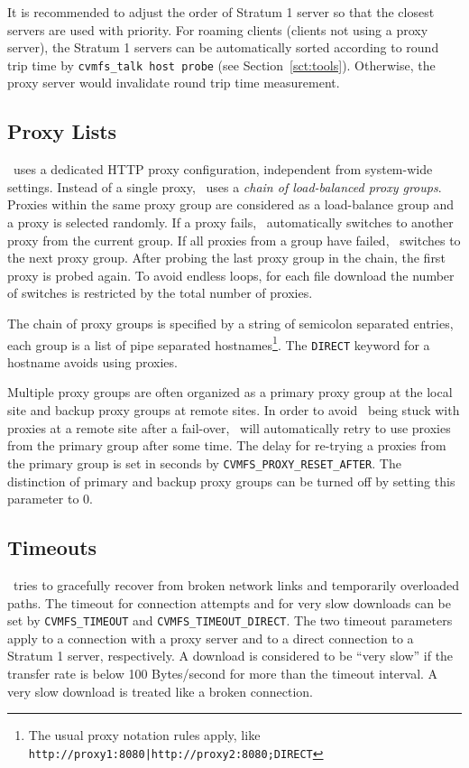 It is recommended to adjust the order of Stratum 1 server so that the closest servers are used with priority.
For roaming clients (\ie clients not using a proxy server), the Stratum 1 servers can be automatically sorted according to round trip time by \texttt{cvmfs\_talk host probe} (see Section~\ref{sct:tools}).
Otherwise, the proxy server would invalidate round trip time measurement.

\subsection{Proxy Lists}
\cvmfs\ uses a dedicated HTTP proxy configuration, independent from system-wide settings.
Instead of a single proxy, \cvmfs\ uses a \emph{chain of load-balanced proxy groups}.
Proxies within the same proxy group are considered as a load-balance group and a proxy is selected randomly.
If a proxy fails, \cvmfs\ automatically switches to another proxy from the current group.
If all proxies from a group have failed, \cvmfs\ switches to the next proxy group.
After probing the last proxy group in the chain, the first proxy is probed again.
To avoid endless loops, for each file download the number of switches is restricted by the total number of proxies.

The chain of proxy groups is specified by a string of semicolon separated entries, each group is a list of pipe separated hostnames\footnote{The usual proxy notation rules apply, like \texttt{http://proxy1:8080|http://proxy2:8080;DIRECT}}.
The \texttt{DIRECT} keyword for a hostname avoids using proxies.

Multiple proxy groups are often organized as a primary proxy group at the local site and backup proxy groups at remote sites.
In order to avoid \cvmfs\ being stuck with proxies at a remote site after a fail-over, \cvmfs\ will automatically retry to use proxies from the primary group after some time.
The delay for re-trying a proxies from the primary group is set in seconds by \texttt{CVMFS\_PROXY\_RESET\_AFTER}.
The distinction of primary and backup proxy groups can be turned off by setting this parameter to 0.

\subsection{Timeouts}
\cvmfs\ tries to gracefully recover from broken network links and temporarily overloaded paths.
The timeout for connection attempts and for very slow downloads can be set by \texttt{CVMFS\_TIMEOUT} and \texttt{CVMFS\_TIMEOUT\_DIRECT}.
The two timeout parameters apply to a connection with a proxy server and to a direct connection to a Stratum 1 server, respectively.
A download is considered to be ``very slow'' if the transfer rate is below 100 Bytes/second for more than the timeout interval.
A very slow download is treated like a broken connection.

